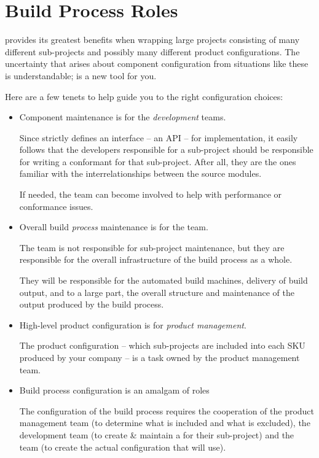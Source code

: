 \section{Build Process Roles}\label{wrap:build-process-roles}

\lmsbw provides its greatest benefits when wrapping large projects
consisting of many different sub-projects and possibly many different
product configurations.  The uncertainty that arises about component
configuration from situations like these is understandable; \lmsbw is
a new tool for you.

Here are a few tenets to help guide you to the right configuration
choices:

\begin{itemize}
  \item Component \makefile maintenance is for the \emph{development} teams.

    Since \lmsbw strictly defines an interface -- an API -- for
    \makefile implementation, it easily follows that the developers
    responsible for a sub-project should be responsible for writing a
    conformant \makefile for that sub-project.  After all, they are
    the ones familiar with the interrelationships between the source
    modules.

    If needed, the \bni team can become involved to help with
    performance or conformance issues.

  \item Overall build \emph{process} maintenance is for the
    \emph{\bni} team.

    The \bni team is not responsible for sub-project \makefile
    maintenance, but they are responsible for the overall
    infrastructure of the build process as a whole.

    They will be responsible for the automated build machines,
    delivery of build output, and to a large part, the overall
    structure and maintenance of the output produced by the build
    process.

  \item High-level product configuration is for \emph{product
    management}.

    The product configuration -- which sub-projects are included into
    each SKU produced by your company -- is a task owned by the
    product management team.

  \item Build process configuration is an amalgam of roles

    The configuration of the build process requires the cooperation of
    the product management team (to determine what is included and
    what is excluded), the development team (to create \& maintain a
    \makefile for their sub-project) and the \bni team (to create the
    actual configuration that \lmsbw will use).
\end{itemize}

